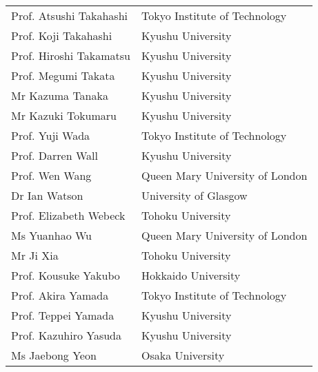 \begin{longtable}{ll}
Prof. Atsushi Takahashi & Tokyo Institute of Technology \\
Prof. Koji Takahashi & Kyushu University \\
Prof. Hiroshi Takamatsu & Kyushu University \\
Prof. Megumi Takata & Kyushu University \\
Mr  Kazuma Tanaka & Kyushu University \\
Mr  Kazuki Tokumaru & Kyushu University \\
Prof. Yuji Wada & Tokyo Institute of Technology \\
Prof. Darren Wall & Kyushu University \\
Prof. Wen Wang & Queen Mary University of London \\
Dr Ian Watson & University of Glasgow \\
Prof. Elizabeth Webeck & Tohoku University \\
Ms  Yuanhao Wu & Queen Mary University of London \\
Mr  Ji Xia & Tohoku University \\
Prof. Kousuke Yakubo & Hokkaido University \\
Prof. Akira Yamada & Tokyo Institute of Technology \\
Prof. Teppei Yamada & Kyushu University \\
Prof. Kazuhiro Yasuda & Kyushu University \\
Ms  Jaebong Yeon & Osaka University \\

\end{longtable}
